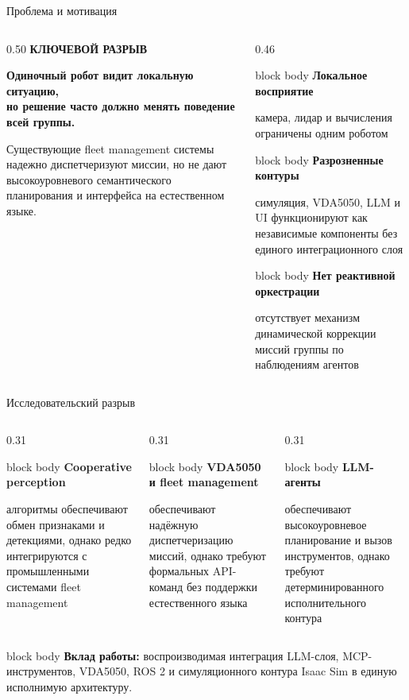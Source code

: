 \documentclass[aspectratio=169,11pt]{beamer}
\newcommand{\keybox}[2]{%
  \begin{beamercolorbox}[wd=\linewidth,sep=0.14cm]{block body}
    {\color{hseblue}\bfseries #1}\par
    \vspace{0.04cm}
    {\small #2}
  \end{beamercolorbox}
}
\newcommand{\sectiontag}[1]{%
  {\scriptsize\bfseries\color{hsegray}\MakeUppercase{#1}}\par\vspace{0.06cm}
}
\begin{document}
\begin{frame}{Проблема и мотивация}
  \begin{columns}[T,onlytextwidth]
    \begin{column}{0.50\textwidth}
      \sectiontag{Ключевой разрыв}
      {\Large\bfseries Одиночный робот видит локальную ситуацию,\\
      но решение часто должно менять поведение всей группы.}
      \vspace{0.35cm}

      \scriptsize
      Существующие fleet management системы надежно диспетчеризуют миссии,
      но не дают высокоуровневого семантического планирования и интерфейса
      на естественном языке.
    \end{column}
    \begin{column}{0.46\textwidth}
      \keybox{Локальное восприятие}{камера, лидар и вычисления ограничены одним роботом}
      \vspace{0.16cm}
      \keybox{Разрозненные контуры}{симуляция, VDA5050, LLM и UI функционируют как независимые компоненты без единого интеграционного слоя}
      \vspace{0.16cm}
      \keybox{Нет реактивной оркестрации}{отсутствует механизм динамической коррекции миссий группы по наблюдениям агентов}
    \end{column}
  \end{columns}
\end{frame}

\begin{frame}{Исследовательский разрыв}
  \begin{columns}[T,onlytextwidth]
    \begin{column}{0.31\textwidth}
      \keybox{Cooperative perception}{алгоритмы обеспечивают обмен признаками и детекциями, однако редко интегрируются с промышленными системами fleet management}
\end{column}
    \begin{column}{0.31\textwidth}
      \keybox{VDA5050 и fleet management}{обеспечивают надёжную диспетчеризацию миссий, однако требуют формальных API-команд без поддержки естественного языка}
\end{column}
    \begin{column}{0.31\textwidth}
      \keybox{LLM-агенты}{обеспечивают высокоуровневое планирование и вызов инструментов, однако требуют детерминированного исполнительного контура}
    \end{column}
  \end{columns}
  \vspace{0.42cm}
  \begin{beamercolorbox}[wd=\linewidth,sep=0.18cm]{block body}
    \textbf{\color{hseblue}Вклад работы:}
    воспроизводимая интеграция LLM-слоя, MCP-инструментов, VDA5050,
    ROS 2 и симуляционного контура Isaac Sim в единую исполнимую архитектуру.
  \end{beamercolorbox}
\end{frame}
\end{document}
